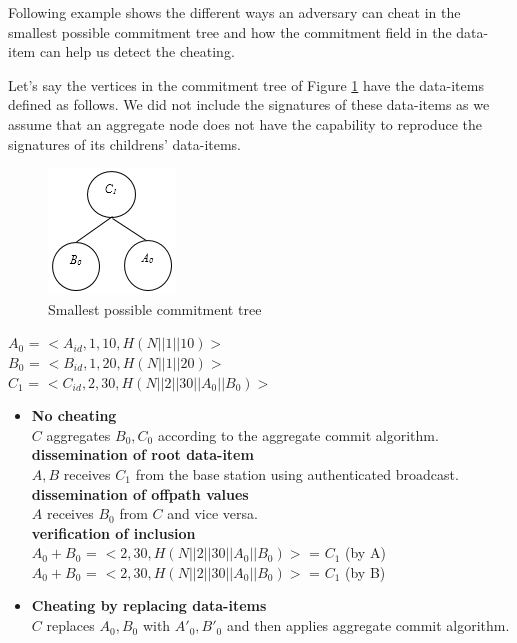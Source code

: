 	Following example shows the different ways an adversary can cheat in the smallest possible commitment tree and how the commitment field in the data-item can help us detect the cheating.
\begin{exmp}
	Let's say the vertices in the commitment tree of Figure \ref{fig:cheating} have the data-items defined as follows.
	We did not include the signatures of these data-items as we assume that an aggregate node does not have the capability to reproduce the signatures of its childrens' data-items.\\
	\begin{figure}[t]
		\centering
		\includegraphics{images/commitment-tree-2.png}
		\caption{Smallest possible commitment tree}
		\label{fig:cheating}
	\end{figure}	
	$A_{0}$ = $<A_{id},1,10, H(N||1||10)>$\\
	$B_{0}$ = $<B_{id},1,20, H(N||1||20)>$\\
	$C_{1}$ = $<C_{id},2,30, H(N||2||30||A_{0}||B_{0})>$
	\begin{itemize}
	\item \textbf{No cheating}\\
		$C$ aggregates $B_{0},C_{0}$ according to the aggregate commit algorithm.\\
		\textbf{dissemination of root data-item}\\
			$A,B$ receives $C_{1}$ from the base station using authenticated broadcast.\\
		\textbf{dissemination of offpath values}\\
			$A$ receives $B_{0}$ from $C$ and vice versa.\\
		\textbf{verification of inclusion}\\
			$A_{0} + B_{0}$ = $<2,30,H(N||2||30||A_{0}||B_{0})>$ = $C_{1}$ (by A)\\
			$A_{0} + B_{0}$ = $<2,30,H(N||2||30||A_{0}||B_{0})>$ = $C_{1}$ (by B)
	\item \textbf{Cheating by replacing data-items}\\
		$C$ replaces $A_{0},B_{0}$ with $A'_{0},B'_{0}$ and then applies aggregate commit algorithm.\\

\end{itemize}
\end{exmp}
